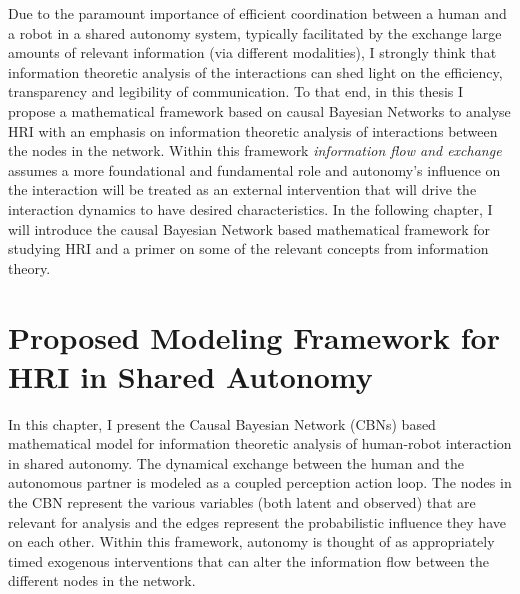 \documentclass[12pt]{article}
\newcommand{\DGc}[1]{{\textbf{\color{blue}{#1}}}}
\begin{document}
Due to the paramount importance of efficient coordination between a human and a robot in a shared autonomy system, typically facilitated by the exchange large amounts of relevant information (via different modalities), I strongly think that information theoretic analysis of the interactions can shed light on the efficiency, transparency and legibility of communication. To that end, in this thesis I propose a mathematical framework based on causal Bayesian Networks to analyse HRI 
with an emphasis on information theoretic analysis of interactions between the nodes in the network. Within this framework \textit{information flow and exchange} assumes a more foundational and fundamental role and autonomy's influence on the interaction will be treated as an external intervention that will drive the interaction dynamics to have desired characteristics. In the following chapter, I will introduce the causal Bayesian Network based mathematical framework for studying HRI and a primer on some of the relevant concepts from information theory. 

% 
%
%
%

%
%
%
%

\pagebreak
\section{Proposed Modeling Framework for HRI in Shared Autonomy}
In this chapter, I present the Causal Bayesian Network (CBNs) based mathematical model for information theoretic analysis of human-robot interaction in shared autonomy. The dynamical exchange between the human and the autonomous partner is modeled as a coupled perception action loop. The nodes in the CBN represent the various variables (both latent and observed) that are relevant for analysis and the edges represent the probabilistic influence they have on each other. Within this framework, autonomy is thought of as appropriately timed exogenous interventions that can alter the information flow between the different nodes in the network.
\end{document}
